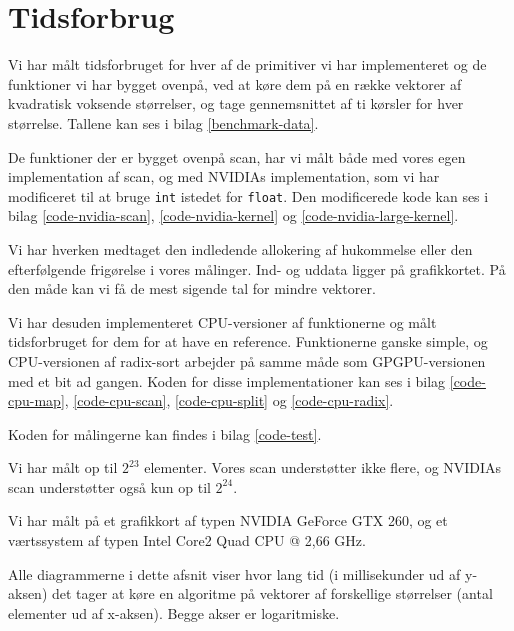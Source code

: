 

\section{Tidsforbrug}
\label{Benchmarks}

Vi har målt tidsforbruget for hver af de primitiver vi har implementeret
og de funktioner vi har bygget ovenpå, ved at køre dem på en række vektorer af 
kvadratisk voksende størrelser, og tage gennemsnittet af ti kørsler for hver 
størrelse. Tallene kan ses i bilag \ref{benchmark-data}.

De funktioner der er bygget ovenpå scan, har vi målt både med vores egen implementation
af scan, og med NVIDIAs implementation, som vi har modificeret til at bruge \verb|int|
istedet for \verb|float|. Den modificerede kode kan ses i bilag 
\ref{code-nvidia-scan}, \ref{code-nvidia-kernel} og \ref{code-nvidia-large-kernel}.

Vi har hverken medtaget den indledende allokering af hukommelse eller den efterfølgende 
frigørelse i vores målinger. Ind- og uddata ligger på grafikkortet.
På den måde kan vi få de mest sigende tal for mindre vektorer.

Vi har desuden implementeret CPU-versioner af funktionerne og målt tidsforbruget for
dem for at have en reference. Funktionerne ganske simple, og CPU-versionen af radix-sort
arbejder på samme måde som GPGPU-versionen med et bit ad gangen.
Koden for disse implementationer kan ses i bilag 
\ref{code-cpu-map}, \ref{code-cpu-scan}, \ref{code-cpu-split} og \ref{code-cpu-radix}.

Koden for målingerne kan findes i bilag \ref{code-test}. 

Vi har målt op til $2^{23}$ elementer. Vores scan understøtter ikke flere, og NVIDIAs
scan understøtter også kun op til $2^{24}$.

Vi har målt på et grafikkort af typen NVIDIA GeForce GTX 260, 
og et værtssystem af typen Intel Core2 Quad CPU @ 2,66 GHz.

Alle diagrammerne i dette afsnit viser hvor lang tid (i millisekunder ud af y-aksen)
det tager at køre en algoritme på vektorer af forskellige størrelser 
(antal elementer ud af x-aksen). Begge akser er logaritmiske.

